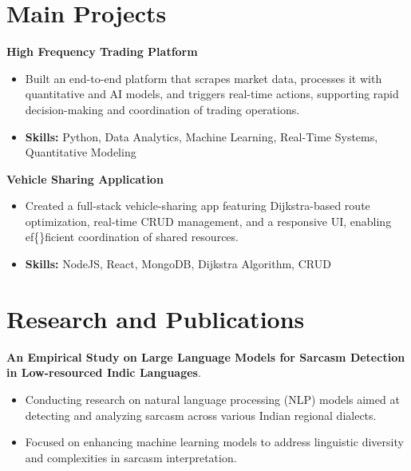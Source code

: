 \documentclass[a4paper,11pt]{article}
\begin{document}
\section{\textbf{Main Projects}}

\vspace{1mm}
  \textbf{High Frequency Trading Platform  }
\vspace{-1.5mm} %
\begin{itemize}
  \item Built an end-to-end platform that scrapes market data, processes it with quantitative and AI models, and triggers real-time actions, supporting rapid decision-making and coordination of trading operations.
\vspace{-3mm}
  \item \textbf{Skills:} Python, Data Analytics, Machine Learning, Real-Time Systems, Quantitative Modeling
\end{itemize}


\vspace{1mm}
   \textbf{Vehicle Sharing Application }
\vspace{-1.5mm} %
\begin{itemize}
  \item Created a full-stack vehicle-sharing app featuring Dijkstra-based route optimization, real-time CRUD management, and a responsive UI, enabling ef\{\}ficient coordination of shared resources.
\vspace{-3mm}
  \item \textbf{Skills:} NodeJS, React, MongoDB, Dijkstra Algorithm, CRUD
\end{itemize}



\section{\textbf{Research and Publications} \hfill }
\vspace{1mm}
  \textbf{An Empirical Study on Large Language Models for Sarcasm Detection in Low-resourced Indic Languages}.
\vspace{-1mm} %
\begin{itemize}
  \item Conducting research on natural language processing (NLP) models aimed at detecting and analyzing sarcasm across various Indian regional dialects.
\vspace{-3mm}
  \item Focused on enhancing machine learning models to address linguistic diversity and complexities in sarcasm interpretation.
\end{itemize}
\end{document}
